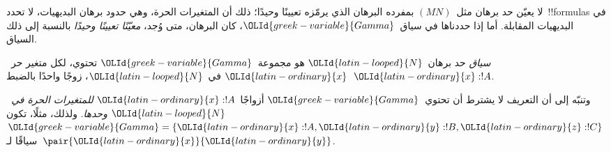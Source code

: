 \documentclass[../../../include/open-logic-section]{subfiles}
\begin{document}


لا يعيّن حد برهان مثل~$(MN)$ بمفرده البرهان الذي يرمّزه تعيينًا وحيدًا؛
ذلك أن المتغيرات الحرة، وهي حدود برهان البديهيات، لا تحدد~!!{formula}s في
البديهيات المقابلة. أما إذا حددناها في سياق~$\OLId{greek-variable}{Gamma}$، كان البرهان، متى
وُجد، \emph{معيّنًا تعيينًا وحيدًا} بالنسبة إلى ذلك السياق.

\begin{defn}
\emph{سياق} حد برهان~$\OLId{latin-looped}{N}$ هو مجموعة~$\OLId{greek-variable}{Gamma}$ تحتوي، لكل متغير حر~$\OLId{latin-ordinary}{x}$ في~$\OLId{latin-looped}{N}$،
زوجًا واحدًا بالضبط~$\OLId{latin-ordinary}{x}:!A$.
\end{defn}

وتنبّه إلى أن التعريف لا يشترط أن تحتوي~$\OLId{greek-variable}{Gamma}$ أزواجًا~$\OLId{latin-ordinary}{x}:!A$
\emph{للمتغيرات الحرة في~$\OLId{latin-looped}{N}$ وحدها}. ولذلك، مثلًا، تكون
$\OLId{greek-variable}{Gamma}=\{\OLId{latin-ordinary}{x}:!A,\OLId{latin-ordinary}{y}:!B,\OLId{latin-ordinary}{z}:!C\}$ سياقًا لـ~$\pair{\OLId{latin-ordinary}{x}}{\OLId{latin-ordinary}{y}}$.
\end{document}
